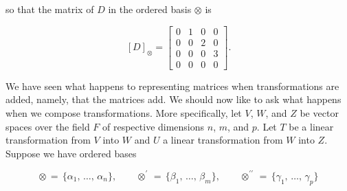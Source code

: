 so that the matrix of \(D\) in the ordered basis \(\otimes\) is

\[[D]_{\otimes}=\begin{bmatrix}0&1&0&0\\ 0&0&2&0\\ 0&0&0&3\\ 0&0&0&0\end{bmatrix}.\]

We have seen what happens to representing matrices when transformations are added, namely, that the matrices add. We should now like to ask what happens when we compose transformations. More specifically, let \(V\), \(W\), and \(Z\) be vector spaces over the field \(F\) of respective dimensions \(n\), \(m\), and \(p\). Let \(T\) be a linear transformation from \(V\) into \(W\) and \(U\) a linear transformation from \(W\) into \(Z\). Suppose we have ordered bases

\[\otimes\,=\,\{\alpha_{1},\,\ldots,\,\alpha_{n}\},\qquad\otimes^{\prime}\,=\, \{\beta_{1},\,\ldots,\,\beta_{m}\},\qquad\otimes^{\prime\prime}\,=\,\{\gamma_{1 },\,\ldots,\,\gamma_{p}\}\] 
